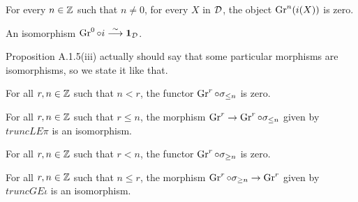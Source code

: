 \begin{proposition}
\label{prop-Gr-pure1}

For every $n\in\mathbb{Z}$ such that $n\ne 0$, for every $X$ in $\mathcal{D}$, the object $\operatorname{Gr}^n(i(X))$ is zero. 

\end{proposition}

\begin{definition}
\label{def-Gr-pure2}

An isomorphism $\operatorname{Gr}^0\circ i\stackrel{\sim}{\longrightarrow} \mathbf{1}_{\mathcal{D}}$.

\end{definition}

Proposition A.1.5(iii) actually should say that some particular morphisms are isomorphisms,
so we state it like that.

\begin{proposition}
\label{prop-Gr-truncLE1}

For all $r,n\in\mathbb{Z}$ such that $n < r$, the functor $\operatorname{Gr}^r\circ\sigma_{\le n}$ is zero.

\end{proposition}

\begin{proposition}
\label{prop-Gr-truncLE2}

For all $r,n\in\mathbb{Z}$ such that $r \le n$, the morphism $\operatorname{Gr}^r\to\operatorname{Gr}^r\circ\sigma_{\le n}$
given by $truncLEπ$ is an isomorphism.

\end{proposition}

\begin{proposition}
\label{prop-Gr-truncGE1}

For all $r,n\in\mathbb{Z}$ such that $r < n$, the functor $\operatorname{Gr}^r\circ\sigma_{\ge n}$ is zero.

\end{proposition}

\begin{proposition}
\label{prop-Gr-truncGE2}

For all $r,n\in\mathbb{Z}$ such that $n \le r$, the morphism $\operatorname{Gr}^r\circ\sigma_{\ge n}\to\operatorname{Gr}^r$
given by $truncGEι$ is an isomorphism.

\end{proposition}



